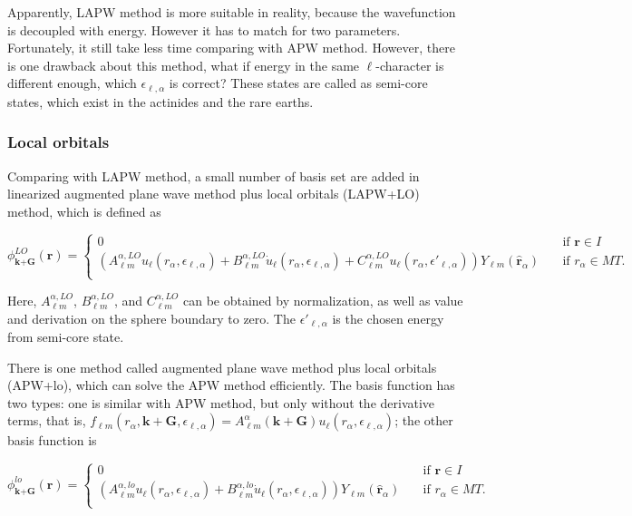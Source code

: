 \documentclass[a4paper, 12pt, titlepage,oneside,drop]{kthesis}
\begin{document}
Apparently, LAPW method is more suitable in reality, because the wavefunction is decoupled with energy. However it has to match for two parameters.
Fortunately, it still take less time comparing with APW method. However, there is one drawback about this method, what if energy in the same ${\ell}$-character is different enough, 
which $\epsilon_{\ell,\alpha}$ is correct? These states are called as semi-core states, which exist in the actinides and the rare earths.

\subsubsection{Local orbitals}
Comparing with LAPW method, a small number of basis set are added in linearized augmented plane wave method plus local orbitals (LAPW+LO) method, which is defined as


\begin{equation}\label{lap5}
\phi^{LO}_{\textbf{k}+\textbf{G}}(\textbf{r}) = 
\begin{cases} 0 & \quad \mbox{if $\textbf{r} \in {I} $}
\\
(A _{{\ell}m}^{\alpha,LO}  u_{{\ell}}(r_{\alpha}, \epsilon_{\ell,\alpha}) + B _{{\ell}m}^{\alpha,LO}  \dot{u}_{{\ell}}(r_{\alpha}, \epsilon_{\ell,\alpha}) + C _{{\ell}m}^{\alpha,LO}  u_{{\ell}}(r_{\alpha}, \epsilon'_{\ell,\alpha})){Y_{{\ell}m}(\hat{\textbf{r}}_{\alpha})} & \quad \mbox{if $r_{\alpha} \in MT. $}\\ 
\end{cases}
\end{equation}
 

Here, $A _{{\ell}m}^{\alpha,LO}$, $B _{{\ell}m}^{\alpha,LO}$, and $C _{{\ell}m}^{\alpha,LO}$ can be obtained by normalization, as well as value and derivation on the sphere boundary to zero. The $\epsilon'_{\ell,\alpha}$ is
the chosen energy from semi-core state.


There is one method called augmented plane wave method plus local orbitals (APW+lo), which can solve the APW method efficiently. The 
basis function has two types: one is similar with APW method, but only without the derivative terms, that is, $f_{{\ell}{m}} (r_{\alpha},\textbf{k}+\textbf{G}, \epsilon_{\ell,\alpha}) =  A _{{\ell}m}^{\alpha}(\textbf{k}+\textbf{G})u_{{\ell}}(r_{\alpha}, \epsilon_{\ell,\alpha})$; 
the other basis function is

\begin{equation}\label{lap6}
\phi^{lo}_\textbf{k+G} (\textbf{r}) = 
\begin{cases} 0 & \quad \mbox{if $\textbf{r} \in {I} $}
\\
(A _{{\ell}m}^{\alpha,lo}  u_{{\ell}}(r_{\alpha}, \epsilon_{\ell,\alpha}) + B _{{\ell}m}^{\alpha,lo}  \dot{u}_{{\ell}}(r_{\alpha}, \epsilon_{\ell,\alpha}) ){Y_{{\ell}m}(\hat{\textbf{r}}_{\alpha})} & \quad \mbox{if $r_{\alpha} \in MT. $}\\ 
\end{cases}
\end{equation}
 
\end{document}
